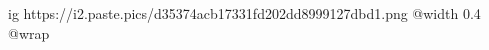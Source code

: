  
 
 
 
 

\ifcmt
  ig https://i2.paste.pics/d35374acb17331fd202dd8999127dbd1.png
  @width 0.4
  @wrap 
\fi
